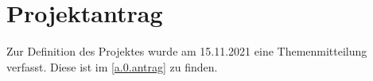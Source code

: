 
\chapter{Projektantrag} \label{0.themenmitteilung}

Zur Definition des Projektes wurde am 15.11.2021 eine Themenmitteilung verfasst. Diese ist im \cref{a.0.antrag} zu finden.